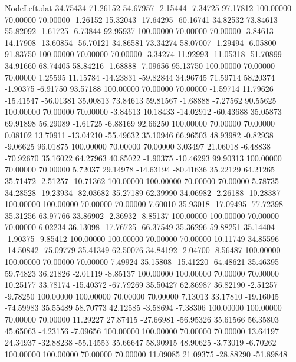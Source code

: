 \begin{filecontents}{NodeLeft.dat}
  34.75434   71.26152   54.67957    -2.15444   -7.34725   97.17812  100.00000   70.00000   70.00000   -1.26152   15.32043  -17.64295  -60.16741
  34.82532   73.84613   55.82092    -1.61725   -6.73844   92.95937  100.00000   70.00000   70.00000   -3.84613   14.17908  -13.60854  -56.70121
  34.86581   73.34274   58.07007    -1.29494   -6.05800   91.83750  100.00000   70.00000   70.00000   -3.34274   11.92993  -11.05318  -51.70899
  34.91660   68.74405   58.84216    -1.68888   -7.09656   95.13750  100.00000   70.00000   70.00000    1.25595   11.15784  -14.23831  -59.82844
  34.96745   71.59714   58.20374    -1.90375   -6.91750   93.57188  100.00000   70.00000   70.00000   -1.59714   11.79626  -15.41547  -56.01381
  35.00813   73.84613   59.81567    -1.68888   -7.27562   90.55625  100.00000   70.00000   70.00000   -3.84613   10.18433  -14.02912  -60.43688
  35.05873   69.91898   56.29089    -1.61725   -6.88169   92.66250  100.00000   70.00000   70.00000    0.08102   13.70911  -13.04210  -55.49632
  35.10946   66.96503   48.93982    -0.82938   -9.06625   96.01875  100.00000   70.00000   70.00000    3.03497   21.06018   -6.48838  -70.92670
  35.16022   64.27963   40.85022    -1.90375  -10.46293   99.90313  100.00000   70.00000   70.00000    5.72037   29.14978  -14.63194  -80.41636
  35.22129   64.21265   35.71472    -2.51257  -10.71362  100.00000  100.00000   70.00000   70.00000    5.78735   34.28528  -19.23934  -82.03682
  35.27189   62.39990   34.06982    -2.26188  -10.28387  100.00000  100.00000   70.00000   70.00000    7.60010   35.93018  -17.09495  -77.72398
  35.31256   63.97766   33.86902    -2.36932   -8.85137  100.00000  100.00000   70.00000   70.00000    6.02234   36.13098  -17.76725  -66.37549
  35.36296   59.88251   35.14404    -1.90375   -9.85412  100.00000  100.00000   70.00000   70.00000   10.11749   34.85596  -14.50842  -75.09779
  35.41349   62.50076   34.84192    -2.04700   -8.56487  100.00000  100.00000   70.00000   70.00000    7.49924   35.15808  -15.41220  -64.48621
  35.46395   59.74823   36.21826    -2.01119   -8.85137  100.00000  100.00000   70.00000   70.00000   10.25177   33.78174  -15.40372  -67.79269
  35.50427   62.86987   36.82190    -2.51257   -9.78250  100.00000  100.00000   70.00000   70.00000    7.13013   33.17810  -19.16045  -74.59983
  35.55489   58.70773   42.12585    -3.58694   -7.38306  100.00000  100.00000   70.00000   70.00000   11.29227   27.87415  -27.66981  -56.95326
  35.61566   56.35803   45.65063    -4.23156   -7.09656  100.00000  100.00000   70.00000   70.00000   13.64197   24.34937  -32.88238  -55.14553
  35.66647   58.90915   48.90625    -3.73019   -6.70262  100.00000  100.00000   70.00000   70.00000   11.09085   21.09375  -28.88290  -51.89848

\end{filecontents}
